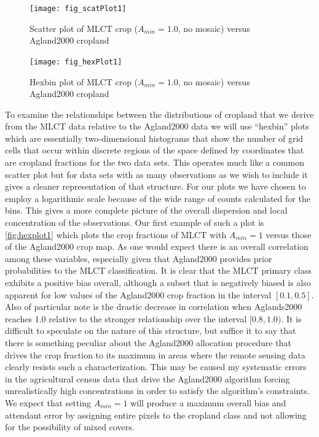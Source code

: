 \begin{figure}[hpt]
  \centering



\texttt{[image: fig\_scatPlot1]}
  \caption{Scatter plot of MLCT crop ($A_{min}=1.0$, no mosaic) versus Agland2000 cropland}
  \label{fig:scatplot1} 
\end{figure} 

\begin{figure}[hpt]
  \centering


\texttt{[image: fig\_hexPlot1]}
  \caption{Hexbin plot of MLCT crop ($A_{min}=1.0$, no mosaic) versus Agland2000 cropland}
  \label{fig:hexplot1} 
\end{figure} 

To examine the relationships between the distributions of cropland
that we derive from the MLCT data relative to the Agland2000 data we
will use ``hexbin'' plots which are essentially two-dimensional
histograms that show the number of grid cells that occur within
discrete regions of the space defined by coordinates that are cropland
fractions for the two data sets.  This operates much like a common
scatter plot but for data sets with as many observations as we wish to
include it gives a cleaner representation of that structure.  For our
plots we have chosen to employ a logarithmic scale because of the wide
range of counts calculated for the bins.  This gives a more complete
picture of the overall dispersion and local concentration of the
observations.  Our first example of such a plot is
\autoref{fig:hexplot1} which plots the crop fractions of MLCT with
$A_{min}=1$ versus those of the Agland2000 crop map.  As one would
expect there is an overall correlation among these variables,
especially given that Agland2000 provides prior probabilities to the
MLCT classification.  It is clear that the MLCT primary class
exhibits a positive bias overall, although a subset that is negatively
biased is also apparent for low values of the Agland2000 crop fraction
in the interval $[0.1,0.5]$.  Also of particular note is the drastic
decrease in correlation when Aglands2000 reaches 1.0 relative to the
stronger relationship over the interval $[0.8,1.0)$.  It is difficult
to speculate on the nature of this structure, but suffice it to say
that there is something peculiar about the Agland2000 allocation
procedure that drives the crop fraction to its maximum in areas where
the remote sensing data clearly resists such a characterization.  This
may be caused my systematic errors in the agricultural census data
that drive the Agland2000 algorithm forcing unrealistically high
concentrations in order to satisfy the algorithm's constraints.  We
expect that setting $A_{min}=1$ will produce a maximum overall bias
and attendant error by assigning entire pixels to the cropland class
and not allowing for the possibility of mixed covers.
 


